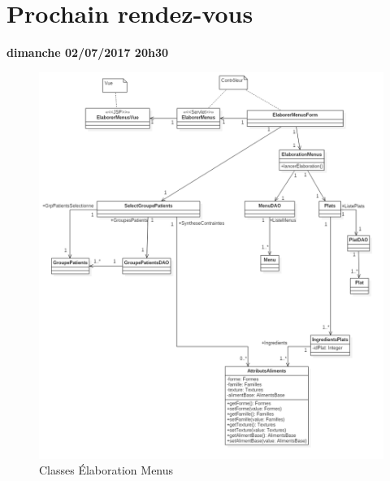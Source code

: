 \documentclass[11pt,a4paper,french,twoside,openright]{article}
\begin{document}
\section{Prochain rendez-vous}
\textbf{dimanche 02/07/2017 20h30}

\begin{figure}
  \centering
      \includegraphics[width=1.00\textwidth]{../../CasDUtilisations/MenuGen/Classes/EMC.png} %
\caption{Classes Élaboration Menus}
\label{ClassesElaborationMenu}
\end{figure}
\end{document}
